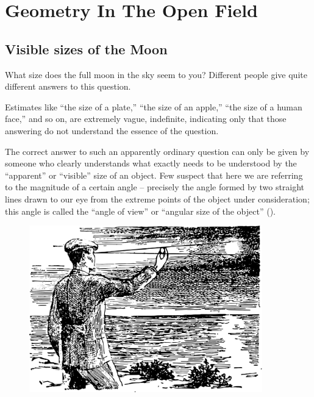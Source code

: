 

\chapter{Geometry In The Open Field}
\label{ch-03}

\section{Visible sizes of the Moon}
\label{sec-3.1}


What size does the full moon in the sky seem to you? Different people give quite different answers to this question.

Estimates like ``the size of a plate,'' ``the size of an apple,'' ``the size of a human face,'' and so on, are extremely vague, indefinite, indicating only that those answering do not understand the essence of the question.

The correct answer to such an apparently ordinary question can only be given by someone who clearly understands what exactly needs to be understood by the ``apparent'' or ``visible'' size of an object. Few suspect that here we are referring to the magnitude of a certain angle -- precisely the angle formed by two straight lines drawn to our eye from the extreme points of the object under consideration; this angle is called the ``angle of view'' or ``angular size of the object'' (). 

\begin{figure}[h!]
\centering
\includegraphics[width=0.9\textwidth]{figures/ch-03/fig-061.pdf}
\end{figure}

